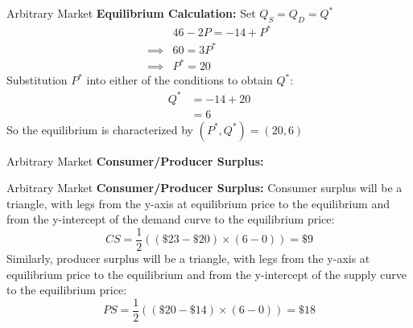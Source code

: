 \documentclass{beamer}
\begin{document}
\begin{frame}[t]{Arbitrary Market}
    \textbf{Equilibrium Calculation:}
    \newline
    \newline Set $Q_S = Q_D = Q^*$
    \[\begin{split}
        &46 - 2P = -14 + P^* \\
        \implies &60 = 3P^* \\
        \implies &\boxed{P^* = 20}
    \end{split}\]
    Substitution $P^*$ into either of the conditions to obtain $Q^*$:
    \[\begin{split}
        Q^* &= -14 + 20 \\
        &= \boxed{6}
    \end{split}\]
    So the equilibrium is characterized by $(P^*, Q^*) = (20, 6)$
\end{frame}

\begin{frame}[t]{Arbitrary Market}
    \textbf{Consumer/Producer Surplus:}
    \begin{center}
    \end{center}
\end{frame}

\begin{frame}[t]{Arbitrary Market}
    \textbf{Consumer/Producer Surplus:}
    \newline
    \newline Consumer surplus will be a triangle, with legs from the y-axis at equilibrium price to the equilibrium and from the y-intercept of the demand curve to the equilibrium price:
    \[CS = \frac{1}{2}((\$23-\$20) \times (6-0)) = \$9\]
    Similarly, producer surplus will be a triangle, with legs from the y-axis at equilibrium price to the equilibrium and from the y-intercept of the supply curve to the equilibrium price:
    \[PS = \frac{1}{2}((\$20-\$14) \times (6-0)) = \$18\]
\end{frame}
\end{document}

